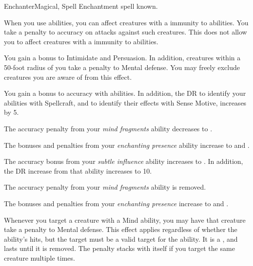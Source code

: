     \begin{feat}{Enchanter}{Magical, Spell}
        \featpre Enchantment spell known.

         When you use  abilities, you can affect creatures with a  immunity to  abilities.
        You take a  penalty to accuracy on attacks against such creatures.
        This does not allow you to affect creatures with a  immunity to  abilities.

         You gain a  bonus to Intimidate and Persuasion.
        In addition, creatures within a 50-foot radius  of you take a  penalty to Mental defense.
        You may freely exclude creatures you are aware of from this effect.

         You gain a  bonus to accuracy with  abilities.
        In addition, the DR to identify your  abilities with Spellcraft, and to identify their effects with Sense Motive, increases by 5.

         The accuracy penalty from your \textit{mind fragments} ability decreases to .

         The bonuses and penalties from your \textit{enchanting presence} ability increase to  and .

         The accuracy bonus from your \textit{subtle influence} ability increases to .
        In addition, the DR increase from that ability increases to 10.

         The accuracy penalty from your \textit{mind fragments} ability is removed.

         The bonuses and penalties from your \textit{enchanting presence} increase to  and .

         Whenever you target a creature with a Mind ability, you may have that creature take a  penalty to Mental defense.
        This effect applies regardless of whether the ability's hits, but the target must be a valid target for the ability.
        It is a , and lasts until it is removed.
        The penalty stacks with itself if you target the same creature multiple times.
    \end{feat}

